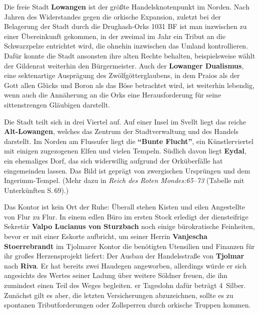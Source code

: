 \spaltenende



\spaltenanfang



Die freie Stadt \textbf{Lowangen} ist der größte Handelsknotenpunkt im Norden.
Nach Jahren des Widerstandes gegen die orkische Expansion, zuletzt bei der Belagerung der Stadt durch die Drughash-Orks 1031 BF ist man inzwischen zu einer Übereinkunft gekommen, in der zweimal im Jahr ein Tribut an die Schwarzpelze entrichtet wird, die ohnehin inzwischen das Umland kontrollieren.
Dafür konnte die Stadt ansonsten ihre alten Rechte behalten, beispielsweise wählt der Gildenrat weiterhin den Bürgermeister.
Auch der \textbf{Lowanger Dualismus}, eine sektenartige Ausprägung des Zwölfgötterglaubens, in dem Praios als der Gott allen Glücks und Boron als das Böse betrachtet wird, ist weiterhin lebendig, wenn auch die Annäherung an die Orks eine Herausforderung für seine sittenstrengen Gläubigen darstellt.


Die Stadt teilt sich in drei Viertel auf. Auf einer Insel im Svellt liegt das reiche \textbf{Alt-Lowangen}, welches das Zentrum der Stadtverwaltung und des Handels darstellt. Im Norden am Flussufer liegt die \textbf{\enquote{Bunte Flucht}}, ein Künstlerviertel mit einigen zugezogenen Elfen und vielen Tempeln.
Südlich davon liegt \textbf{Eydal}, ein ehemaliges Dorf, das sich widerwillig aufgrund der Orküberfälle hat eingemeinden lassen.
Das Bild ist geprägt von zwergischen Ursprüngen und dem Ingerimm-Tempel.
(Mehr dazu in \emph{Reich des Roten Mondes:65--73} (Tabelle mit Unterkünften S.\,69).)


Das Kontor ist kein Ort der Ruhe:
Überall stehen Kisten und eilen Angestellte von Flur zu Flur. In einem edlen Büro im ersten Stock erledigt der diensteifrige Sekretär \textbf{Valpo Lucianus von Sturzbach} noch einige bürokratische Feinheiten, bevor er mit einer Eskorte aufbricht,
	um seiner Herrin \textbf{Vanjescha Stoerrebrandt} im Tjolmarer Kontor die benötigten Utensilien und Finanzen für ihr großes Herzensprojekt liefert:
	Der Ausbau der Handelsstraße von \textbf{Tjolmar} nach \textbf{Riva}.
	Er hat bereits zwei Haudegen angeworben, allerdings würde er sich angesichts des Wertes seiner Ladung über weitere Söldner freuen, die ihn zumindest einen Teil des Weges begleiten. 
	er Tageslohn dafür beträgt 4~Silber. Zunächst gilt es aber, die letzten Versicherungen abzuzeichnen, sollte es zu spontanen Tributforderungen oder Zollsperren durch orkische Truppen kommen.


